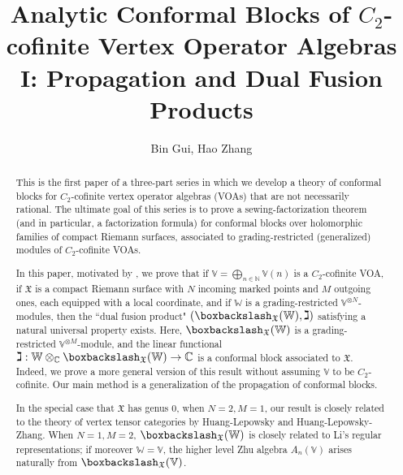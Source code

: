 \documentclass[11pt,b5paper,notitlepage]{article}
\title{Analytic Conformal Blocks of $C_2$-cofinite Vertex Operator Algebras I: Propagation and Dual Fusion Products}
\author{{\sc Bin Gui, Hao Zhang}
}
\date{}
\theoremstyle{definition}
\theoremstyle{plain}
\newcommand{\fk}{\mathfrak}
\newcommand{\Vbb}{\mathbb V}
\newcommand{\Wbb}{\mathbb W}
\newcommand{\Cbb}{\mathbb C}
\newcommand{\Nbb}{\mathbb N}
\newcommand{\<}{\left\langle}
\renewcommand{\>}{\right\rangle}
\newcommand{\fx}{\mathfrak{X}}
\newcommand{\bbs}{\boxbackslash}
\numberwithin{equation}{subsection}
\begin{document}
\sloppy %
	\setcounter{section}{-1}
	
	
	
	\maketitle
	
	
\newcommand\blfootnote[1]{%
	\begingroup
	\renewcommand\thefootnote{}\footnote{#1}%
	\addtocounter{footnote}{-1}%
	\endgroup
}



\begin{abstract}
This is the first paper of a three-part series in which we develop a theory of conformal blocks for $C_2$-cofinite vertex operator algebras (VOAs) that are not necessarily rational. The ultimate goal of this series is to prove a sewing-factorization theorem (and in particular, a factorization formula) for conformal blocks over holomorphic families of compact Riemann surfaces, associated to grading-restricted (generalized) modules of $C_2$-cofinite VOAs.

In this paper, motivated by \cite{KZ-conformal-block}, we prove that if $\Vbb=\bigoplus_{n\in\Nbb}\Vbb(n)$ is a $C_2$-cofinite VOA, if $\fx$ is a compact Riemann surface with $N$ incoming marked points and $M$ outgoing ones, each  equipped with a local coordinate, and if $\Wbb$ is a grading-restricted $\Vbb^{\otimes N}$-modules, then the ``dual fusion product" $(\bbs_\fx(\Wbb),\gimel)$ satisfying a natural universal property exists. Here, $\bbs_\fx(\Wbb)$ is a grading-restricted $\Vbb^{\otimes M}$-module, and the linear functional $\gimel:\Wbb\otimes_\Cbb\bbs_\fx(\Wbb)\rightarrow\Cbb$ is a conformal block associated to $\fx$. Indeed, we prove a more general version of this result without assuming $\Vbb$ to be $C_2$-cofinite. Our main method is a generalization of the propagation of conformal blocks.

In the special case that $\fk X$ has genus $0$, when $N=2,M=1$, our result is closely related to the theory of vertex tensor categories by Huang-Lepowsky and Huang-Lepowsky-Zhang. When $N=1,M=2$, $\bbs_\fx(\Wbb)$ is closely related to Li's regular representations; if moreover $\Wbb=\Vbb$, the higher level Zhu algebra $A_n(\Vbb)$ arises naturally from $\bbs_\fx(\Vbb)$.
\end{abstract}
\end{document}
